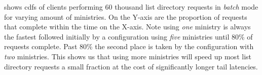 shows \acp{cdf} of clients performing 60 thousand list directory requests in \textit{batch} mode for varying amount of ministries. On the Y-axis are the proportion of requests that complete within the time on the X-axis. Note using \textit{one} ministry is always the fastest followed initially by a configuration using \textit{five} ministries until 80\% of requests complete. Past 80\% the second place is taken by the configuration with \textit{two} ministries. This shows us that using more ministries will speed up most list directory requests a small fraction at the cost of significantly longer tail latencies.

